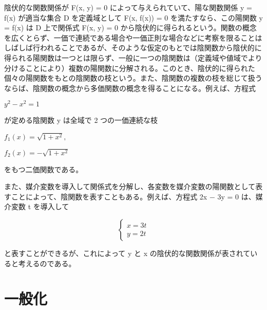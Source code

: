 \documentclass[a4j,12pt]{jreport}
\begin{document}
陰伏的な関数関係が F(x, y) = 0 によって与えられていて、陽な関数関係 y = f(x) が適当な集合 D を定義域として F(x, f(x)) = 0 を満たすなら、この陽関数 y = f(x) は D 上で関係式 F(x, y) = 0 から陰伏的に得られるという。関数の概念を広くとらず、一価で連続である場合や一価正則な場合などに考察を限ることはしばしば行われることであるが、そのような仮定のもとでは陰関数から陰伏的に得られる陽関数は一つとは限らず、一般に一つの陰関数は（定義域や値域でより分けることにより）複数の陽関数に分解される。このとき、陰伏的に得られた個々の陽関数をもとの陰関数の枝という。また、陰関数の複数の枝を総じて扱うならば、陰関数の概念から多価関数の概念を得ることになる。例えば、方程式

$y^2 - x^2 = 1$

が定める陰関数 y は全域で 2 つの一価連続な枝

$f_1(x)=\sqrt{1 + x^2} ,$

$f_2(x)=- \sqrt{1 + x^2}$

をもつ二価関数である。

また、媒介変数を導入して関係式を分解し、各変数を媒介変数の陽関数として表すことによって、陰関数を表すこともある。例えば、方程式 2x − 3y = 0 は、媒介変数 t を導入して

$$
\begin{cases}
x = 3t\\
y = 2t
\end{cases}
$$

と表すことができるが、これによって y と x の陰伏的な関数関係が表されていると考えるのである。


\chapter{一般化}
\end{document}
